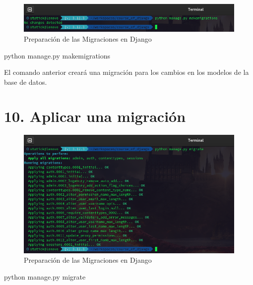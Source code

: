 \documentclass[
  a4paper,
  DIV=11,
  numbers=noendperiod,
  onepage,
  openany]{scrreprt}
\newenvironment{Shaded}{\begin{snugshade}}{\end{snugshade}}
\newcommand{\ExtensionTok}[1]{\textcolor[rgb]{0.00,0.23,0.31}{#1}}
\newcommand{\NormalTok}[1]{\textcolor[rgb]{0.00,0.23,0.31}{#1}}
\begin{document}
\begin{figure}[H]

{\centering \includegraphics{images/preparacion_migraciones_django.png}

}

\caption{Preparación de las Migraciones en Django}

\end{figure}%

\begin{Shaded}
\begin{Highlighting}[]
\ExtensionTok{python}\NormalTok{ manage.py makemigrations}
\end{Highlighting}
\end{Shaded}

El comando anterior creará una migración para los cambios en los modelos
de la base de datos.

\section{10. Aplicar una migración}\label{aplicar-una-migraciuxf3n}

\begin{figure}[H]

{\centering \includegraphics{images/migraciones_django.png}

}

\caption{Preparación de las Migraciones en Django}

\end{figure}%

\begin{Shaded}
\begin{Highlighting}[]
\ExtensionTok{python}\NormalTok{ manage.py migrate}
\end{Highlighting}
\end{Shaded}
\end{document}
